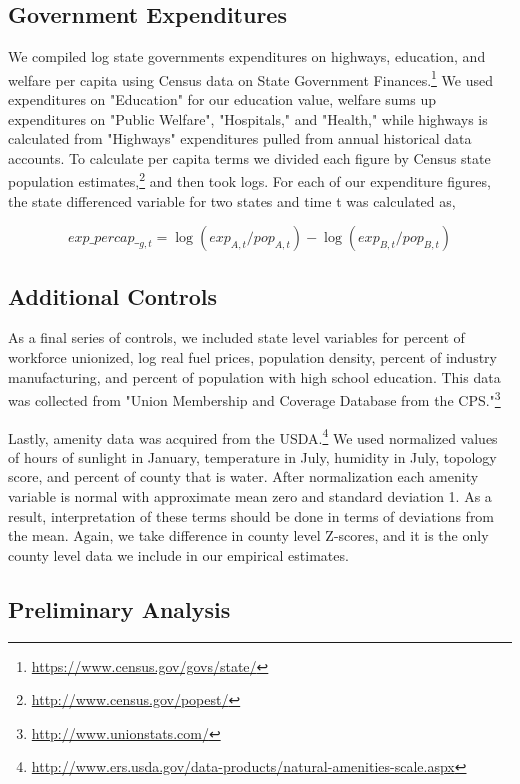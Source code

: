 \subsection{Government Expenditures}

We compiled log state governments expenditures on highways, education, and welfare per capita using Census data on State Government Finances.\footnote{\url{https://www.census.gov/govs/state/}} We used expenditures on "Education" for our education value, welfare sums up expenditures on "Public Welfare", "Hospitals," and "Health," while highways is calculated from "Highways" expenditures pulled from annual historical data accounts. To calculate per capita terms we divided each figure by Census state population estimates,\footnote{\url{http://www.census.gov/popest/}} and then took logs. For each of our expenditure figures, the state differenced variable for two states and time t was calculated as,

\begin{equation} exp\_percap\__{g,t} = \log(exp_{A,t}/pop_{A,t}) - \log(exp_{B,t}/pop_{B,t}) \end{equation}

\subsection{Additional Controls}

As a final series of controls, we included state level variables for percent of workforce unionized, log real fuel prices, population density, percent of industry manufacturing, and percent of population with high school education. This data was collected from "Union Membership and Coverage Database from the CPS."\footnote{\url{http://www.unionstats.com/}}

Lastly, amenity data was acquired from the USDA.\footnote{\url{http://www.ers.usda.gov/data-products/natural-amenities-scale.aspx}} We used normalized values of hours of sunlight in January, temperature in July, humidity in July, topology score, and percent of county that is water. After normalization each amenity variable is normal with approximate mean zero and standard deviation 1. As a result, interpretation of these terms should be done in terms of deviations from the mean. Again, we take difference in county level Z-scores, and it is the only county level data we include in our empirical estimates.

\subsection{Preliminary Analysis}

